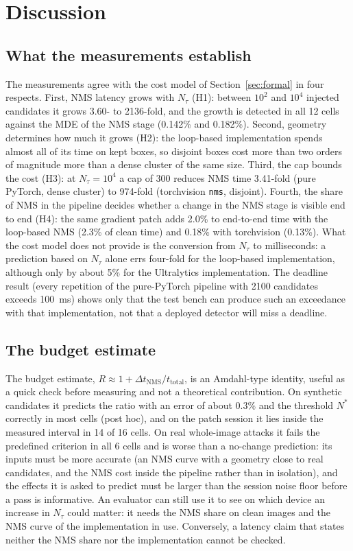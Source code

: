 \documentclass[a4paper,fleqn]{cas-dc}
\newcommand{\Ntau}{N_{\tau}}
\begin{document}
\section{Discussion}
\label{sec:discussion}
\subsection{What the measurements establish}
The measurements agree with the cost model of Section~\ref{sec:formal} in four respects. First, NMS latency grows with $\Ntau$ (H1): between $10^2$ and $10^4$ injected candidates it grows 3.60- to 2136-fold, and the growth is detected in all 12 cells against the MDE of the NMS stage (0.142\% and 0.182\%). Second, geometry determines how much it grows (H2): the loop-based implementation spends almost all of its time on kept boxes, so disjoint boxes cost more than two orders of magnitude more than a dense cluster of the same size. Third, the cap bounds the cost (H3): at $\Ntau=10^4$ a cap of 300 reduces NMS time 3.41-fold (pure PyTorch, dense cluster) to 974-fold (torchvision \texttt{nms}, disjoint). Fourth, the share of NMS in the pipeline decides whether a change in the NMS stage is visible end to end (H4): the same gradient patch adds 2.0\% to end-to-end time with the loop-based NMS (2.3\% of clean time) and 0.18\% with torchvision (0.13\%). What the cost model does not provide is the conversion from $\Ntau$ to milliseconds: a prediction based on $\Ntau$ alone errs four-fold for the loop-based implementation, although only by about 5\% for the Ultralytics implementation. The deadline result (every repetition of the pure-PyTorch pipeline with 2100 candidates exceeds 100~ms) shows only that the test bench can produce such an exceedance with that implementation, not that a deployed detector will miss a deadline.

\subsection{The budget estimate}
The budget estimate, $R \approx 1 + \Delta t_{\mathrm{NMS}}/t_{\mathrm{total}}$, is an Amdahl-type identity, useful as a quick check before measuring and not a theoretical contribution. On synthetic candidates it predicts the ratio with an error of about 0.3\% and the threshold $N^{*}$ correctly in most cells (post hoc), and on the patch session it lies inside the measured interval in 14 of 16 cells. On real whole-image attacks it fails the predefined criterion in all 6 cells and is worse than a no-change prediction: its inputs must be more accurate (an NMS curve with a geometry close to real candidates, and the NMS cost inside the pipeline rather than in isolation), and the effects it is asked to predict must be larger than the session noise floor before a pass is informative. An evaluator can still use it to see on which device an increase in $\Ntau$ could matter: it needs the NMS share on clean images and the NMS curve of the implementation in use. Conversely, a latency claim that states neither the NMS share nor the implementation cannot be checked.
\end{document}
